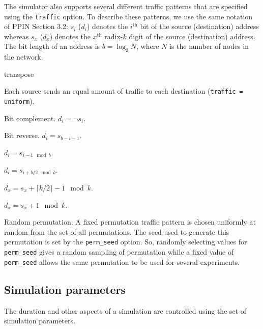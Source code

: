 \documentclass[11pt]{article}
\begin{document}
The simulator also supports several different traffic patterns that
are specified using the \texttt{traffic} option.  To describe these
patterns, we use the same notation of PPIN Section 3.2: $s_i$ ($d_i$)
denotes the $i^\textrm{th}$ bit of the source (destination) address
whereas $s_x$ ($d_x$) denotes the $x^\textrm{th}$ radix-$k$ digit of
the source (destination) address.  The bit length of an address is $b
= \log_2 N$, where $N$ is the number of nodes in the network.

\begin{opt_list}{transpose}
\item[uniform] Each source sends an equal amount of traffic to each
destination (\texttt{traffic = uniform}).
\item[bitcomp] Bit complement. $d_i = \neg s_i$.
\item[bitrev] Bit reverse. $d_i = s_{b-i-1}$.
\item[shuffle] $d_i = s_{i-1 \mod b}$.
\item[transpose] $d_i = s_{i+b/2 \mod b}$.
\item[tornado] $d_x = s_x + \lceil k/2 \rceil - 1 \mod k$.
\item[neighbor] $d_x = s_x + 1 \mod k$.
\item[randperm] Random permutation.  A fixed permutation traffic
pattern is chosen uniformly at random from the set of all
permutations.  The seed used to generate this permutation is set by
the \texttt{perm\_seed} option.  So, randomly selecting values for
\texttt{perm\_seed} gives a random sampling of permutation while a
fixed value of \texttt{perm\_seed} allows the same permutation to be
used for several experiments.
\end{opt_list}

\subsection{Simulation parameters}
\label{sec:sim_params}

The duration and other aspects of a simulation are controlled using
the set of simulation parameters.
\end{document}
